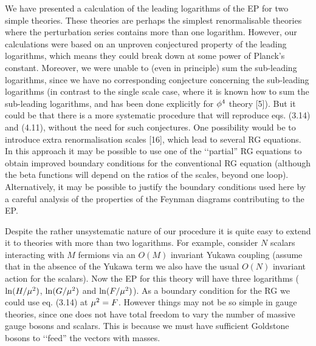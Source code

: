 We have presented a calculation of the leading logarithms of the
EP for two simple theories. These theories are perhaps the simplest
renormalisable theories where the perturbation series contains more
than one logarithm. However, our calculations were based on an
unproven conjectured property of the leading logarithms, which
means they could break down at some power of Planck's constant.
Moreover, we were unable to (even in principle) sum the sub-leading
logarithms, since we have no corresponding conjecture concerning
the sub-leading logarithms (in contrast to the single scale case,
where it is known how to sum the sub-leading logarithms, and has
been done explicitly for $\phi^4$ theory [5]). But it could be
that there is a more systematic procedure that will reproduce
eqs. (3.14) and (4.11), without the need for such conjectures.
One possibility would be to introduce extra renormalisation scales
[16], which lead to several RG equations. In this approach it may
be possible to use one of the \lq\lq partial'' RG equations to
obtain improved boundary conditions for the conventional RG
equation (although the beta functions will depend on the ratios
of the scales, beyond one loop). Alternatively, it may be possible
to justify the boundary conditions used here by a careful analysis
of the properties of the Feynman diagrams contributing to the
EP.

Despite the rather unsystematic nature of our procedure it is quite
easy to extend it to  theories with more than two logarithms. For
example, consider $N$ scalars interacting with $M$ fermions via an
$O(M)$ invariant Yukawa coupling (assume that in the absence of
the Yukawa term we also have the usual $O(N)$ invariant action
for the scalars). Now the EP for this theory will have three
logarithms ($\ln(H/\mu^2)$, $\ln(G/\mu^2)$ and $\ln(F/\mu^2)$).
As a boundary condition for the RG we could use eq. (3.14)
at $\mu^2=F$.
However things may not be so simple in gauge theories, since one
does not have total freedom to vary the number of massive gauge bosons and
scalars. This is because we must have sufficient Goldstone bosons
to \lq\lq feed'' the vectors with masses.

